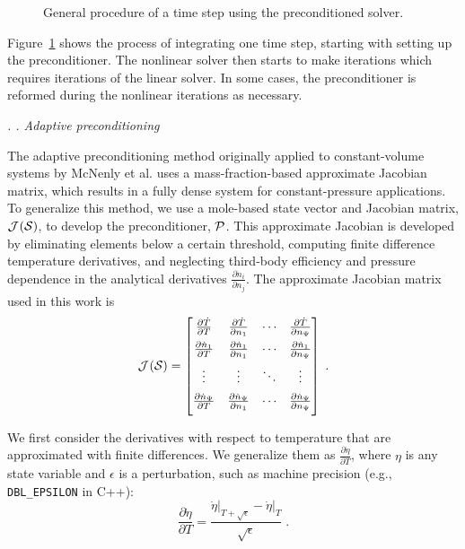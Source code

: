 \documentclass[twocolumn,10pt]{article} %
\renewcommand{\subsection}%
              [1]%
              {%
               \bgroup%
               \flushleft%
               \small\em%
               \stepcounter{subsection}%
               \arabic{section}.%
               \arabic{subsection}. #1%
               \par%
               \egroup%
              }%
\newcommand{\sectionTwo}[1]{\subsection{#1} \addvspace{10pt}}
\begin{document}
\begin{figure}[htb]
    \centering
    \IntegrationOverview[0.85]{}
    \caption{General procedure of a time step using the preconditioned solver.}
    \label{f:integration_process}
\end{figure}

Figure~\ref{f:integration_process} shows the process of integrating one time step, starting with setting up the preconditioner.
The nonlinear solver then starts to make iterations which requires iterations of the linear solver.
In some cases, the preconditioner is reformed during the nonlinear iterations as necessary.

\sectionTwo{Adaptive preconditioning}
\label{sec:methods-adaptive}

The adaptive preconditioning method originally applied to constant-volume systems
by McNenly et al.\cite{mcnenly_faster_2015} uses a mass-fraction-based approximate Jacobian matrix, which results in a fully dense system for constant-pressure applications.
To generalize this method, we use a mole-based state vector and Jacobian matrix, $\mathcal{J}^{}(\mathcal{S}{})$, to develop the preconditioner, $\mathcal{P}$.
This approximate Jacobian is developed by eliminating elements below a certain threshold, computing finite difference temperature derivatives, and neglecting third-body efficiency and pressure dependence in the analytical derivatives $\frac{\partial \dot{n}_i}{\partial n_j}$.
The approximate Jacobian matrix used in this work is
\begin{equation}
    \J{\S{}} =
    \begin{bmatrix}
        \jacline{\dot{T}}
        \jacline{\dot{n}_{1}}
        \dotsline{}
        \jacline{\dot{n}_{\nspecies}}
    \end{bmatrix} \;.
\end{equation}

%
%
We first consider the derivatives with respect to temperature that are approximated with finite differences.
We generalize them as $\frac{\partial \dot{\eta}}{\partial T}$, where $\eta$ is any state variable and $\epsilon$ is a perturbation, such as machine precision (e.g., \texttt{DBL\_EPSILON} in C++):
\begin{equation}
    \label{eq:temp-dervs}
    \frac{\partial \dot{\eta}}{\partial T} = \frac{\dot{\eta}\big\vert_{T+\sqrt{\epsilon}}-\dot{\eta}\big\vert_{T}}{\sqrt{\epsilon}} \;.
\end{equation}
\end{document}

